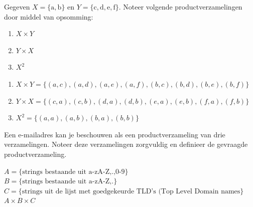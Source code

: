\begin{oef}
Gegeven $X = \{\mathrm{a},\mathrm{ b}\}$ en $Y = \{\mathrm{c}, \mathrm{d}, \mathrm{e}, \mathrm{f}\}$. Noteer volgende productverzamelingen door middel van opsomming:
\begin{enumerate}
\item $X\times Y$
\item $Y\times X$
\item $X^2$
\end{enumerate}
\begin{opl}
\begin{enumerate}
\item $X\times Y=\{(a,c),(a,d),(a,e),(a,f),(b,c),(b,d),(b,e),(b,f) \}$
\item $Y\times X=\{(c,a),(c,b),(d,a),(d,b),(e,a),(e,b),(f,a),(f,b) \}$
\item $X^2=\{(a,a),(a,b),(b,a),(b,b) \}$
\end{enumerate}
\end{opl}
\end{oef}

\begin{oef}
Een e-mailadres kan je beschouwen als  een productverzameling van drie verzamelingen. Noteer deze verzamelingen zorgvuldig en definieer de gevraagde productverzameling.
\begin{opl}
$A=\{\text{strings bestaande uit a-zA-Z,.,0-9} \}$\\
$B=\{\text{strings bestaande uit a-zA-Z,.} \}$\\
$C=\{ \text{strings uit de lijst met goedgekeurde TLD's (Top Level Domain names}\}$\\
$A\times B\times C$
\end{opl}
\end{oef}


